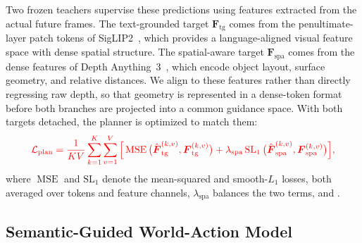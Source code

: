 Two frozen teachers supervise these predictions using features extracted from the actual future frames.
The text-grounded target $\mathbf{F}_{\mathrm{tg}}$ comes from the
penultimate-layer patch tokens of SigLIP2~\cite{siglip2}, which provides a language-aligned visual feature space with dense spatial structure.
The spatial-aware target $\mathbf{F}_{\mathrm{spa}}$ comes from the dense
features of Depth Anything~3~\cite{lin2025depth}, which encode object layout,
surface geometry, and relative distances.
We align to these features rather than directly regressing raw depth, so that geometry is represented in a dense-token format before both branches are projected into a common guidance space.
With both targets detached, the planner is optimized to match them:
\begin{equation}
    \color{red}
    \mathcal{L}_{\mathrm{plan}}
    =
    \frac{1}{KV}\sum_{k=1}^{K}\sum_{v=1}^{V}
    \Big[
    \operatorname{MSE}\big(\hat{\boldsymbol{F}}_{\mathrm{tg}}^{(k,v)},\boldsymbol{F}_{\mathrm{tg}}^{(k,v)}\big)
    +
    \lambda_{\mathrm{spa}}
    \operatorname{SL_1}\big(\hat{\boldsymbol{F}}_{\mathrm{spa}}^{(k,v)},\boldsymbol{F}_{\mathrm{spa}}^{(k,v)}\big)
    \Big],
    \label{eq:planner_loss}
\end{equation}
where $\operatorname{MSE}$ and $\operatorname{SL_1}$ denote the mean-squared and
smooth-$L_1$ losses, both averaged over tokens and feature channels,
$\lambda_{\mathrm{spa}}$ balances the two terms, and .

\subsection{Semantic-Guided World-Action Model}
\label{sec:method_guidance}

